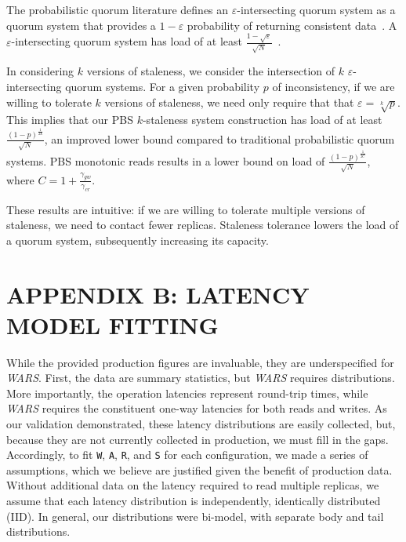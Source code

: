 \documentclass{vldb}
\begin{document}
The probabilistic quorum literature defines an
$\varepsilon$-intersecting quorum system as a quorum system that
provides a $1-\varepsilon$ probability of returning consistent
data~\cite[Definition 3.1]{prob-quorum}.  A $\varepsilon$-intersecting
quorum system has load of at least 
$\frac{1-\sqrt{\varepsilon}}{\sqrt{N}}$~\cite[Corollary
  3.12]{prob-quorum}.

In considering $k$ versions of staleness, we consider the intersection
of $k$ $\varepsilon$-intersecting quorum systems.  For a given
probability $p$ of inconsistency, if we are willing to tolerate $k$
versions of staleness, we need only require that that $\varepsilon =
\sqrt[k]{p}$.  This implies that our PBS $k$-staleness system
construction has load of at least
$\frac{(1-p)^{\frac{1}{2k}}}{\sqrt{N}}$, an improved lower bound
compared to traditional probabilistic quorum systems.  PBS monotonic
reads results in a lower bound on load of
$\frac{(1-p)^{\frac{1}{2C}}}{\sqrt{N}}$, where
$C=1+\frac{\gamma_{gw}}{\gamma_{cr}}$.

These results are intuitive: if we are willing to tolerate multiple
versions of staleness, we need to contact fewer replicas.  Staleness
tolerance lowers the load of a quorum system, subsequently increasing
its capacity.


\section*{APPENDIX B: LATENCY MODEL FITTING}

While the provided production figures are invaluable, they are
underspecified for \textit{WARS}.  First, the data are summary
statistics, but \textit{WARS} requires distributions.  More
importantly, the operation latencies represent round-trip times, while
\textit{WARS} requires the constituent one-way latencies for both
reads and writes.  As our validation demonstrated, these latency
distributions are easily collected, but, because they are not
currently collected in production, we must fill in the
gaps. Accordingly, to fit \texttt{W}, \texttt{A}, \texttt{R}, and
\texttt{S} for each configuration, we made a series of assumptions,
which we believe are justified given the benefit of production data.
Without additional data on the latency required to read multiple
replicas, we assume that each latency distribution is independently,
identically distributed (IID).  In general, our distributions were
bi-model, with separate body and tail distributions.
\end{document}
